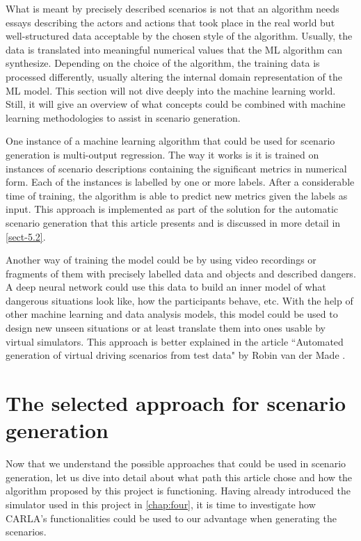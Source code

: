 What is meant by precisely described scenarios is not that an algorithm needs essays describing the actors and actions that took place in the real world but well-structured data acceptable by the chosen style of the algorithm. Usually, the data is translated into meaningful numerical values that the ML algorithm can synthesize. Depending on the choice of the algorithm, the training data is processed differently, usually altering the internal domain representation of the ML model. This section will not dive deeply into the machine learning world. Still, it will give an overview of what concepts could be combined with machine learning methodologies to assist in scenario generation.

One instance of a machine learning algorithm that could be used for scenario generation is multi-output regression. The way it works is it is trained on instances of scenario descriptions containing the significant metrics in numerical form. Each of the instances is labelled by one or more labels. After a considerable time of training, the algorithm is able to predict new metrics given the labels as input. This approach is implemented as part of the solution for the automatic scenario generation that this article presents and is discussed in more detail in \autoref{sect-5.2}.

Another way of training the model could be by using video recordings or fragments of them with precisely labelled data and objects and described dangers. A deep neural network could use this data to build an inner model of what dangerous situations look like, how the participants behave, etc. With the help of other machine learning and data analysis models, this model could be used to design new unseen situations or at least translate them into ones usable by virtual simulators. This approach is better explained in the article ``Automated generation of virtual driving scenarios from test data" by Robin van der Made \cite{van2015automated}.

\section{The selected approach for scenario generation} \label{sect-5.2}

Now that we understand the possible approaches that could be used in scenario generation, let us dive into detail about what path this article chose and how the algorithm proposed by this project is functioning. Having already introduced the simulator used in this project in \autoref{chap:four}, it is time to investigate how CARLA's functionalities could be used to our advantage when generating the scenarios.

